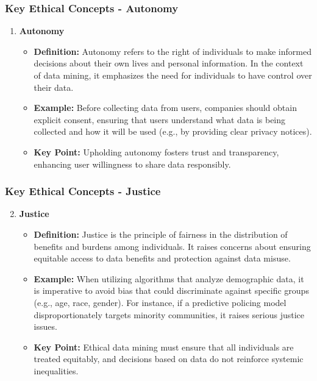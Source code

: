 \documentclass[aspectratio=169]{beamer}
\begin{document}
\begin{frame}[fragile]
    \frametitle{Key Ethical Concepts - Autonomy}
    \begin{enumerate}
        \item \textbf{Autonomy}
            \begin{itemize}
                \item \textbf{Definition:} Autonomy refers to the right of individuals to make informed decisions about their own lives and personal information. In the context of data mining, it emphasizes the need for individuals to have control over their data.
                \item \textbf{Example:} Before collecting data from users, companies should obtain explicit consent, ensuring that users understand what data is being collected and how it will be used (e.g., by providing clear privacy notices).
                \item \textbf{Key Point:} Upholding autonomy fosters trust and transparency, enhancing user willingness to share data responsibly.
            \end{itemize}
    \end{enumerate}
\end{frame}

\begin{frame}[fragile]
    \frametitle{Key Ethical Concepts - Justice}
    \begin{enumerate}
        \setcounter{enumi}{1}  %
        \item \textbf{Justice}
            \begin{itemize}
                \item \textbf{Definition:} Justice is the principle of fairness in the distribution of benefits and burdens among individuals. It raises concerns about ensuring equitable access to data benefits and protection against data misuse.
                \item \textbf{Example:} When utilizing algorithms that analyze demographic data, it is imperative to avoid bias that could discriminate against specific groups (e.g., age, race, gender). For instance, if a predictive policing model disproportionately targets minority communities, it raises serious justice issues.
                \item \textbf{Key Point:} Ethical data mining must ensure that all individuals are treated equitably, and decisions based on data do not reinforce systemic inequalities.
            \end{itemize}
    \end{enumerate}
\end{frame}
\end{document}
